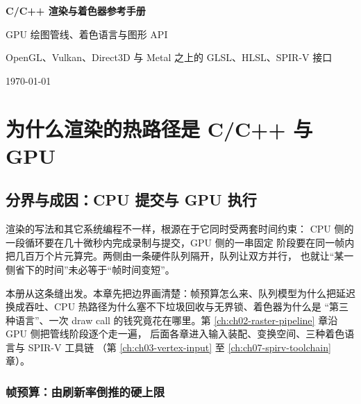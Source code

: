 \documentclass[12pt,a4paper,fontset=fandol]{ctexbook}
\newcommand{\Lang}[1]{\textsf{#1}}
\newcommand{\DomCPU}{\Lang{CPU}}
\newcommand{\DomGPU}{\Lang{GPU}}
\newcommand{\SPIV}{\Lang{SPIR-V}}
\begin{document}
\frontmatter

\begin{titlepage}
\centering
\vspace*{4cm}
{\Huge\bfseries C/C++ 渲染与着色器参考手册\par}
\vspace{1cm}
{\LARGE GPU 绘图管线、着色语言与图形 API\par}
\vspace{0.4cm}
{\Large OpenGL、Vulkan、Direct3D 与 Metal 之上的 GLSL、HLSL、SPIR-V 接口\par}
\vfill
{\large \today\par}
\end{titlepage}

\tableofcontents

\mainmatter

\cleardoublepage


\part{为什么渲染的热路径是 C/C++ 与 GPU}
\chapter{分界与成因：CPU 提交与 GPU 执行}
\label{ch:ch01-boundary}

渲染的写法和其它系统编程不一样，根源在于它同时受两套时间约束：
\DomCPU{} 侧的一段循环要在几十微秒内完成录制与提交，\DomGPU{} 侧的一串固定
阶段要在同一帧内把几百万个片元算完。两侧由一条硬件队列隔开，队列让双方并行，
也就让``某一侧省下的时间''未必等于``帧时间变短''。

本册从这条缝出发。本章先把边界画清楚：帧预算怎么来、队列模型为什么把延迟
换成吞吐、\DomCPU{} 热路径为什么塞不下垃圾回收与无界锁、着色器为什么是
``第三种语言''、一次 draw call 的钱究竟花在哪里。第
\ref{ch:ch02-raster-pipeline} 章沿 \DomGPU{} 侧把管线阶段逐个走一遍，
后面各章进入输入装配、变换空间、三种着色语言与 \SPIV{} 工具链
（第 \ref{ch:ch03-vertex-input} 至 \ref{ch:ch07-spirv-toolchain} 章）。

\section{帧预算：由刷新率倒推的硬上限}
\end{document}
